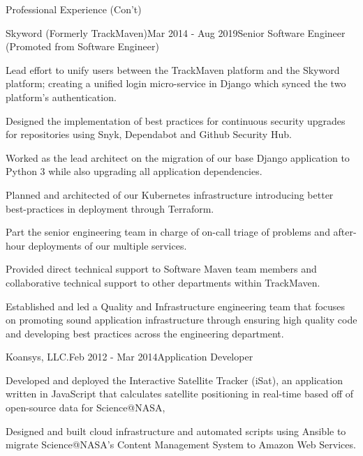 \documentclass{bluefin_cv}
\begin{document}
\begin{bfcvSection}{Professional Experience (Con't)}

\begin{bfcvWorkSubsection}{Skyword (Formerly TrackMaven)}{Mar 2014 - Aug 2019}{Senior Software Engineer (Promoted from Software Engineer)}
\item Lead effort to unify users between the TrackMaven platform and the Skyword platform; creating a unified login micro-service in Django which synced the two platform's authentication.
\item Designed the implementation of best practices for continuous security upgrades for repositories using Snyk, Dependabot and Github Security Hub.
\item Worked as the lead architect on the migration of our base Django application to Python 3 while also upgrading all application dependencies.
\item Planned and architected of our Kubernetes infrastructure introducing better best-practices in deployment through Terraform.
\item Part the senior engineering team in charge of on-call triage of problems and after-hour deployments of our multiple services.
\item Provided direct technical support to Software Maven team members and collaborative technical support to other departments within TrackMaven.
\item Established and led a Quality and Infrastructure engineering team that focuses on promoting sound application infrastructure through ensuring high quality code and developing best practices across the engineering department.
\end{bfcvWorkSubsection}

\begin{bfcvWorkSubsection}{Koansys, LLC.}{Feb 2012 - Mar 2014}{Application Developer}
\item Developed and deployed the Interactive Satellite Tracker (iSat), an application written in JavaScript that calculates satellite positioning in real-time based off of open-source data for Science@NASA,
\item Designed and built cloud infrastructure and automated scripts using Ansible to migrate Science@NASA’s Content Management System to Amazon Web Services.
\end{bfcvWorkSubsection}
\end{bfcvSection}
\end{document}
